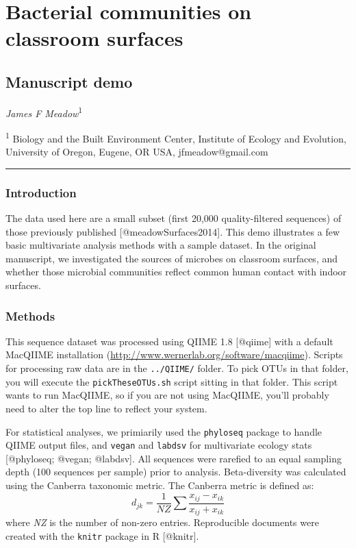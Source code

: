 \section{Bacterial communities on classroom surfaces}

\subsection{Manuscript demo}

\emph{James F Meadow}\textsuperscript{1}

\textsuperscript{1} Biology and the Built Environment Center, Institute
of Ecology and Evolution, University of Oregon, Eugene, OR USA,
jfmeadow@gmail.com

\begin{center}\rule{3in}{0.4pt}\end{center}

\subsubsection{Introduction}

The data used here are a small subset (first 20,000 quality-filtered
sequences) of those previously published {[}@meadowSurfaces2014{]}. This
demo illustrates a few basic multivariate analysis methods with a sample
dataset. In the original manuscript, we investigated the sources of
microbes on classroom surfaces, and whether those microbial communities
reflect common human contact with indoor surfaces.

\subsubsection{Methods}

This sequence dataset was processed using QIIME 1.8 {[}@qiime{]} with a
default MacQIIME installation
(\url{http://www.wernerlab.org/software/macqiime}). Scripts for
processing raw data are in the \texttt{../QIIME/} folder. To pick OTUs
in that folder, you will execute the \texttt{pickTheseOTUs.sh} script
sitting in that folder. This script wants to run MacQIIME, so if you are
not using MacQIIME, you'll probably need to alter the top line to
reflect your system.

For statistical analyses, we primiarily used the \texttt{phyloseq}
package to handle QIIME output files, and \texttt{vegan} and
\texttt{labdsv} for multivariate ecology stats {[}@phyloseq; @vegan;
@labdsv{]}. All sequences were rarefied to an equal sampling depth (100
sequences per sample) prior to analysis. Beta-diversity was calculated
using the Canberra taxonomic metric. The Canberra metric is defined as:
\[ d_{jk} = \frac{1}{NZ} \sum \frac{x_{ij}-x_{ik}}{x_{ij}+x_{ik}} \]
where \emph{NZ} is the number of non-zero entries. Reproducible
documents were created with the \texttt{knitr} package in R
{[}@knitr{]}.

